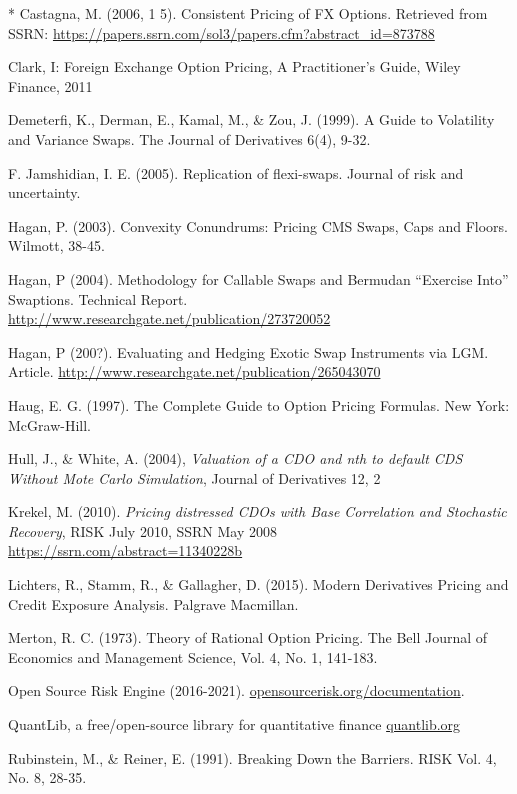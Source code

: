 \begin{thebibliography}{*}
 Castagna, M. (2006, 1 5). Consistent Pricing of FX Options. Retrieved from SSRN: \url{https://papers.ssrn.com/sol3/papers.cfm?abstract\_id=873788}

 Clark, I: Foreign Exchange Option Pricing, A Practitioner's Guide, Wiley Finance, 2011

 Demeterfi, K., Derman, E., Kamal, M., \& Zou, J. (1999). A Guide to Volatility and Variance Swaps. The Journal of Derivatives 6(4), 9-32.

 F. Jamshidian, I. E. (2005). Replication of flexi-swaps. Journal of risk and uncertainty.

 Hagan, P. (2003). Convexity Conundrums: Pricing CMS Swaps, Caps and Floors. Wilmott, 38-45.

 Hagan, P (2004). Methodology for Callable Swaps and Bermudan ``Exercise Into''
  Swaptions. Technical Report. \url{http://www.researchgate.net/publication/273720052}

 Hagan, P (200?). Evaluating and Hedging Exotic Swap Instruments via
  LGM. Article. \url{http://www.researchgate.net/publication/265043070}

 Haug, E. G. (1997). The Complete Guide to Option Pricing Formulas. New York: McGraw-Hill.

 Hull, J., \& White, A. (2004), {\em Valuation of a CDO and nth to default CDS Without Mote Carlo Simulation}, Journal of Derivatives 12, 2

 Krekel, M. (2010). {\em Pricing distressed CDOs with Base Correlation and Stochastic Recovery}, RISK July 2010, SSRN May 2008 \url{https://ssrn.com/abstract=11340228b}

 Lichters, R., Stamm, R., \& Gallagher, D. (2015). Modern Derivatives Pricing and Credit Exposure Analysis. Palgrave Macmillan.

 Merton, R. C. (1973). Theory of Rational Option Pricing. The Bell Journal of Economics and Management Science, Vol. 4, No. 1, 141-183.

 Open Source Risk Engine (2016-2021). \url{opensourcerisk.org/documentation}.

 QuantLib, a free/open-source library for quantitative finance \url{quantlib.org}

 Rubinstein, M., \& Reiner, E. (1991). Breaking Down the Barriers. RISK Vol. 4, No. 8, 28-35.


\end{thebibliography}

